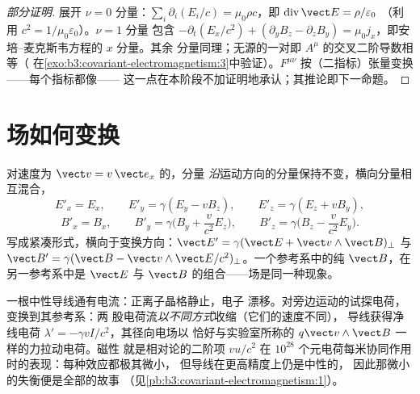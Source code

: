 \begin{proof}[部分证明]
展开 $\nu = 0$ 分量：$\sum_i\partial_i(E_i/c) =
\mu_0\rho c$，即 $\operatorname{div}\vect E = \rho/\varepsilon_0$
（利用 $c^2 = 1/\mu_0\varepsilon_0$）。$\nu = 1$ 分量
包含 $-\partial_t(E_x/c^2) + (\partial_yB_z - \partial_zB_y)
= \mu_0 j_x$，即安培–麦克斯韦方程的 $x$ 分量。其余
分量同理；无源的一对即
$A^\mu$ 的交叉二阶导数相等（
在\cref{exo:b3:covariant-electromagnetism:3}中验证）。$F^{\mu\nu}$
按（二指标）张量变换——每个指标都像——
这一点在本阶段不加证明地承认；其推论即下一命题。
\end{proof}

\section{场如何变换}

\begin{proposition}[场的变换]\label{prop:b3:covariant-electromagnetism:transform}
对速度为 $\vect v = v\,\vect e_x$ 的，分量
\emph{沿}运动方向的分量保持不变，横向分量相互混合，
\[
E'_x = E_x , \qquad
E'_y = \gamma(E_y - vB_z) , \qquad
E'_z = \gamma(E_z + vB_y) ,
\]
\[
B'_x = B_x , \qquad
B'_y = \gamma\Big(B_y + \frac{v}{c^2}E_z\Big) , \qquad
B'_z = \gamma\Big(B_z - \frac{v}{c^2}E_y\Big) .
\]
写成紧凑形式，横向于变换方向：$\vect E' = \gamma(\vect E +
\vect v\wedge\vect B)_\perp$ 与 $\vect B' = \gamma(\vect B - \vect
v\wedge\vect E/c^2)_\perp$。一个参考系中的纯 $\vect B$，在另一参考系中是 $\vect
E$ 与 $\vect B$ 的组合——场是同一种现象。
\end{proposition}
\admitted

\begin{example}[中性导线的磁性]\label{ex:b3:covariant-electromagnetism:wire}
一根中性导线通有电流：正离子晶格静止，电子
漂移。对旁边运动的试探电荷，变换到其参考系：两
股电荷流\emph{以不同方式}收缩（它们的速度不同），
导线获得净线电荷 $\lambda' =
-\gamma vI/c^2$，其径向电场以
恰好与实验室所称的 $q\vect v\wedge\vect B$ 一样的力拉动电荷。磁性
就是相对论的二阶项 $v u/c^2$ 在
$10^{28}$ 个元电荷每米协同作用时的表现：每种效应都极其微小，
但导线在更高精度上仍是中性的，
因此那微小的失衡便是全部的故事
（见\cref{pb:b3:covariant-electromagnetism:1}）。
\end{example}

